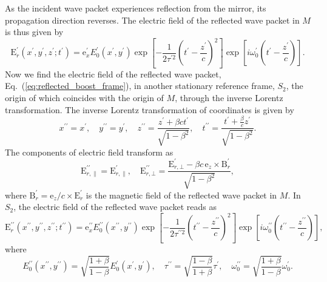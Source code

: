 \documentclass[10pt, a4paper, twoside, openright]{report}
\renewcommand{\vec}[1]{\boldsymbol{\mathrm{#1}}}
\begin{document}
As the incident wave packet experiences reflection from the mirror, its propagation direction reverses. The electric field of the reflected wave packet in $ M $ is thus given by
\begin{equation}\label{eq:reflected_boost_frame}
\vec{E}^{\prime}_r \left(x^{\prime}, y^{\prime}, z^{\prime}; t^{\prime} \right) = \vec{e}_x^{\prime} E^{\prime}_0 \left(x^{\prime}, y^{\prime} \right) \exp \left[ - \frac{1}{2\tau^{\prime 2}} \left(t^{\prime} - \frac{z^{\prime}}{c}\right)^2 \right] \exp \left[ i \omega_0^{\prime} \left(t^{\prime} - \frac{z^{\prime}}{c}\right) \right].
\end{equation}
Now we find the electric field of the reflected wave packet, Eq.~(\ref{eq:reflected_boost_frame}), in another stationary reference frame, $ S_2 $, the origin of which coincides with the origin of $ M $, through the inverse Lorentz transformation. The inverse Lorentz transformation of coordinates is given by
\begin{equation}\label{eq:inverse_lorentz_transform_coords}
x^{\prime \prime} = x^{\prime}, \quad y^{\prime \prime} = y^{\prime}, \quad z^{\prime \prime} = \frac{z^{\prime} + \beta c t^{\prime}}{\sqrt{1 - \beta^2}}, \quad t^{\prime \prime} = \frac{t^{\prime} + \frac{\beta}{c} z^{\prime}}{\sqrt{1 - \beta^2}}.
\end{equation}
The components of electric field transform as
\begin{equation}\label{eq:inverse_lorentz_transform_fields}
	\vec{E}^{\prime \prime}_{r, \parallel} = \vec{E}^{\prime}_{r, \parallel}, \quad \vec{E}^{\prime \prime}_{r, \bot} = \frac{\vec{E}^{\prime}_{r, \bot} - \beta c \, \vec{e}_z \times \vec{B}^{\prime}_{r}}{\sqrt{1 - \beta^2}},
\end{equation}
where $ \vec{B}^{\prime}_{r} = \vec{e}_z / c \times \vec{E}^{\prime}_r $ is the magnetic field of the reflected wave packet in $ M $. In $ S_2 $, the electric field of the reflected wave packet reads as
\begin{equation}\label{eq:reflected_lab_frame_1}
\vec{E}^{\prime \prime}_r \left(x^{\prime \prime}, y^{\prime \prime}, z^{\prime \prime}; t^{\prime \prime} \right) = \vec{e}_x^{\prime \prime} E^{\prime \prime}_0 \left(x^{\prime \prime}, y^{\prime \prime} \right) \exp \left[ - \frac{1}{2 \tau^{\prime \prime 2}} \left(t^{\prime \prime} - \frac{z^{\prime \prime}}{c}\right)^2 \right] \exp \left[ i \omega_0^{\prime \prime} \left(t^{\prime \prime} - \frac{z^{\prime \prime}}{c}\right) \right],
\end{equation}
where
\begin{equation}\label{eq:coeff_lab}
E^{\prime \prime}_0 \left(x^{\prime \prime}, y^{\prime \prime} \right) = \sqrt{\frac{1 + \beta}{1 - \beta}} E^{\prime}_0 \left(x^{\prime}, y^{\prime} \right), \quad \tau^{\prime \prime} = \sqrt{\frac{1 - \beta}{1 + \beta}} \tau^{\prime}, \quad \omega_0^{\prime \prime} = \sqrt{\frac{1 + \beta}{1 - \beta}} \omega_0^{\prime}.
\end{equation}
\end{document}
